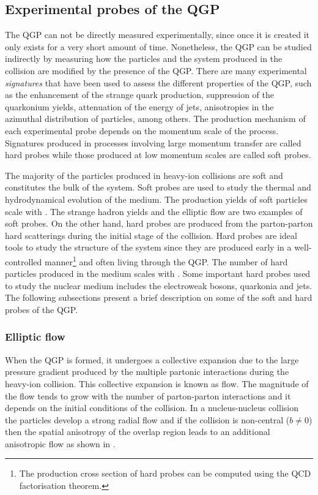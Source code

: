 \subsection{Experimental probes of the QGP}

The QGP can not be directly measured experimentally, since once it is created it only exists for a very short amount of time. Nonetheless, the QGP can be studied indirectly by measuring how the particles and the system produced in the collision are modified by the presence of the QGP. There are many experimental \textit{signatures} that have been used to assess the different properties of the QGP, such as the enhancement of the strange quark production, suppression of the quarkonium yields, attenuation of the energy of jets, anisotropies in the azimuthal distribution of particles, among others. The production mechanism of each experimental probe depends on the momentum scale of the process. Signatures produced in processes involving large momentum transfer are called hard probes while those produced at low momentum scales are called soft probes.

The majority of the particles produced in heavy-ion collisions are soft and constitutes the bulk of the system. Soft probes are used to study the thermal and hydrodynamical evolution of the medium. The production yields of soft particles scale with \npart. The strange hadron yields and the elliptic flow are two examples of soft probes. On the other hand, hard probes are produced from the parton-parton hard scatterings during the initial stage of the collision. Hard probes are ideal tools to study the structure of the system since they are produced early in a well-controlled manner\footnote{The production cross section of hard probes can be computed using the QCD factorisation theorem.} and often living through the QGP. The number of hard particles produced in the medium  scales with \ncoll. Some important hard probes used to study the nuclear medium includes the electroweak bosons, quarkonia and jets. The following subsections present a brief description on some of the soft and hard probes of the QGP.


\subsubsection{Elliptic flow}

When the QGP is formed, it undergoes a collective expansion due to the large pressure gradient produced by the multiple partonic interactions during the heavy-ion collision. This collective expansion is known as flow. The magnitude of the flow tends to grow with the number of parton-parton interactions and it depends on the initial conditions of the collision. In a nucleus-nucleus collision the particles develop a strong radial flow and if the collision is non-central ($b \neq 0$) then the spatial anisotropy of the overlap region leads to an additional anisotropic flow as shown in .

